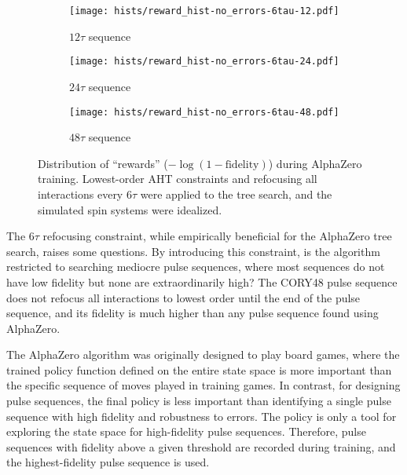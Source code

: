 \begin{figure}[H]
    \centering
    \begin{subfigure}{.49\textwidth}
        \centering
        \texttt{[image: hists/reward\_hist-no\_errors-6tau-12.pdf]}
        \caption{$12\tau$ sequence}
        \label{fig:reward_hist-no_errors-6tau-12}
    \end{subfigure}
    \begin{subfigure}{.49\textwidth}
        \centering
        \texttt{[image: hists/reward\_hist-no\_errors-6tau-24.pdf]}
        \caption{$24\tau$ sequence}
        \label{fig:reward_hist-no_errors-6tau-24}
    \end{subfigure}
    \begin{subfigure}{.49\textwidth}
        \centering
        \texttt{[image: hists/reward\_hist-no\_errors-6tau-48.pdf]}
        \caption{$48\tau$ sequence}
        \label{fig:reward_hist-no_errors-6tau-48}
    \end{subfigure}
    \caption{Distribution of ``rewards'' ($-\log(1 - \text{fidelity})$) during AlphaZero training. Lowest-order AHT constraints and refocusing all interactions every $6\tau$ were applied to the tree search, and the simulated spin systems were idealized.}
    \label{fig:reward_hist-no_errors-6tau}
\end{figure}

The $6\tau$ refocusing constraint, while empirically beneficial for the AlphaZero tree search, raises some questions. By introducing this constraint, is the algorithm restricted to searching mediocre pulse sequences, where most sequences do not have low fidelity but none are extraordinarily high? The CORY48 pulse sequence does not refocus all interactions to lowest order until the end of the pulse sequence, and its fidelity is much higher than any pulse sequence found using AlphaZero.


The AlphaZero algorithm was originally designed to play board games, where the trained policy function defined on the entire state space is more important than the specific sequence of moves played in training games. In contrast, for designing pulse sequences, the final policy is less important than identifying a single pulse sequence with high fidelity and robustness to errors. The policy is only a tool for exploring the state space for high-fidelity pulse sequences. Therefore, pulse sequences with fidelity above a given threshold are recorded during training, and the highest-fidelity pulse sequence is used.

